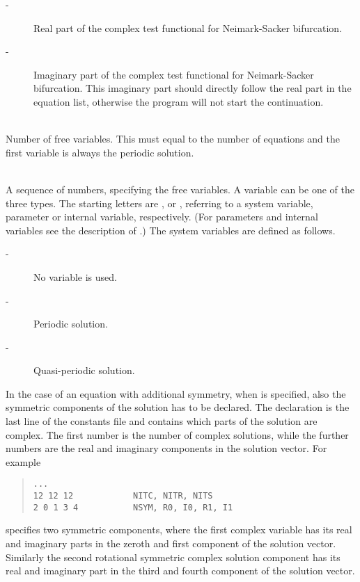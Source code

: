\documentclass[10pt,a4paper]{ddedoc}
\begin{document}
\begin{description}
\begin{description}
\item[ -] Real part of the complex test functional for Neimark-Sacker bifurcation.
\item[ -] Imaginary part of the complex test functional for Neimark-Sacker bifurcation. This imaginary part should directly follow the real part in the equation list, otherwise the program will not start the continuation.
\end{description}
\item[\funp{NVAR}] ~\\
	Number of free variables. This must equal to the number of equations and the first variable is always the periodic solution.
\item[\funp{VAR}] ~\\
	A sequence of numbers, specifying the free variables. A variable can be one of the three types. The starting letters are ,  or , referring to a system variable, parameter or internal variable, respectively. (For parameters and internal variables see the description of .) The system variables are defined as follows.
\begin{description}
\item[ -] No variable is used.
\item[ -] Periodic solution.
\item[ -] Quasi-periodic solution.
\end{description}
In the case of an equation with additional symmetry, when  is specified, also the symmetric components of the solution has to be declared.
The declaration is the last line of the constants file and contains which parts of the solution are complex. The first number is the number of complex solutions,
while the further numbers are the real and imaginary components in the solution vector. For example
{ \small \begin{quote} \begin{lstlisting}[basicstyle=\tt,frame=single]
...
12 12 12            NITC, NITR, NITS
2 0 1 3 4           NSYM, R0, I0, R1, I1
\end{lstlisting} \end{quote} } \noindent
specifies two symmetric components, where the first complex variable has its real and imaginary parts in the zeroth and first component of the solution vector.
Similarly the second rotational symmetric complex solution component has its real and imaginary part in the third and fourth component of the solution vector.
\end{description}
\end{document}

